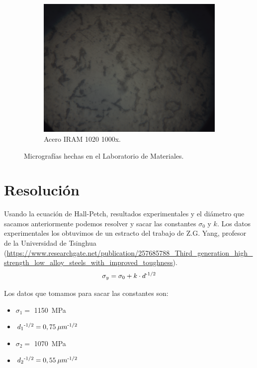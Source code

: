 \documentclass[12pt,a4paper]{article}
\begin{document}
\begin{figure}[h!]
    \begin{subfigure}[b]{0.6\linewidth}
        \centering
        \includegraphics[width=\linewidth]{Figuras/Del-Rio_8.png}
        \caption{Acero IRAM 1020 1000x.}
        \label{1000x}
    \end{subfigure}
    \caption{Micrografías hechas en el Laboratorio de Materiales.}
    \label{fig:metalografia}
\end{figure}

\section{Resolución}
Usando la ecuación de Hall-Petch, resultados experimentales y el diámetro que sacamos anteriormente podemos resolver y sacar las constantes $\sigma_0$ y $k$. Los datos experimentales los obtuvimos de un estracto del trabajo de Z.G. Yang, profesor de la Universidad de Tsinghua (\url{https://www.researchgate.net/publication/257685788_Third_generation_high_strength_low_alloy_steels_with_improved_toughness}).
\begin{equation}
    \sigma_y = \sigma_0 +k\cdot d \textsuperscript{-1/2}
\end{equation}

Los datos que tomamos para sacar las constantes son:
\begin{itemize}
    \item$\sigma_1=$ \SI{1 150}{\mega\pascal}
    \item\(d_1 \textsuperscript{-1/2}=0,75\: \mu m\textsuperscript{-1/2}\)
    \item$\sigma_2=$ \SI{1 070}{\mega\pascal}
    \item\(d_2 \textsuperscript{-1/2}=0,55\: \mu m\textsuperscript{-1/2}\)
\end{itemize}
\end{document}
